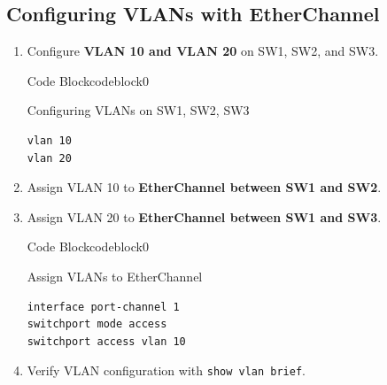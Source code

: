\documentclass[a4paper]{article}
\begin{document}
\subsection{Configuring VLANs with EtherChannel}
\begin{enumerate}
	\item Configure \textbf{VLAN 10 and VLAN 20} on SW1, SW2, and SW3.


	      \begin{ocg}{Code Block}{codeblock}{0}

		      \vspace{0.5cm}
		      Configuring VLANs on SW1, SW2, SW3
		      \begin{lstlisting}
vlan 10
vlan 20
\end{lstlisting}

		      \vspace{0.5cm}
	      \end{ocg}
	\item Assign VLAN 10 to \textbf{EtherChannel between SW1 and SW2}.
	\item Assign VLAN 20 to \textbf{EtherChannel between SW1 and SW3}.


	      \begin{ocg}{Code Block}{codeblock}{0}

		      \vspace{0.5cm}
		      Assign VLANs to EtherChannel
		      \begin{lstlisting}
interface port-channel 1
switchport mode access
switchport access vlan 10
\end{lstlisting}

		      \vspace{0.5cm}
	      \end{ocg}

	\item Verify VLAN configuration with \texttt{show vlan brief}.
\end{enumerate}
\end{document}
